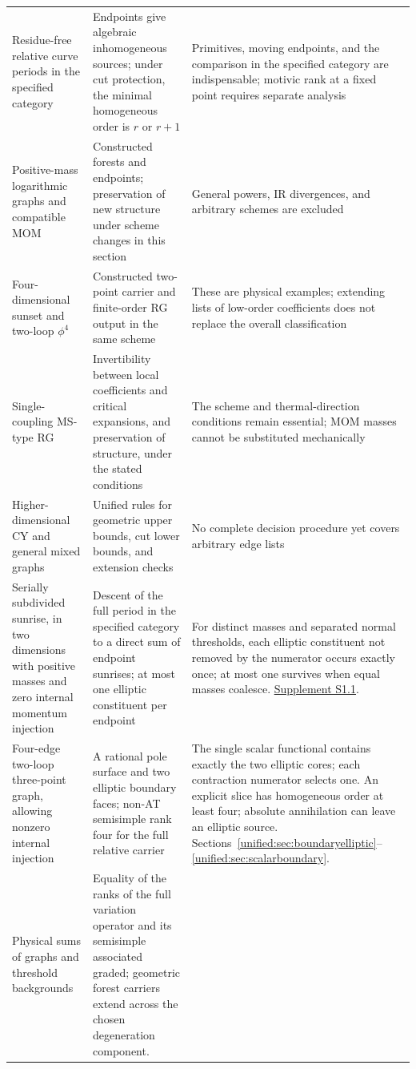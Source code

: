 \documentclass[11pt,a4paper,oneside]{article}
\theoremstyle{plain}
\theoremstyle{definition}
\theoremstyle{remark}
\numberwithin{equation}{section}
\newcommand{\otherref}[2]{\href{#1.pdf}{#2}}
\begin{document}
\begin{center}
\begin{longtable}{>{\raggedright\arraybackslash}p{29mm}>{\raggedright\arraybackslash}p{51mm}>{\raggedright\arraybackslash}p{61mm}}
Residue-free relative curve periods in the specified category&
Endpoints give algebraic inhomogeneous sources; under cut protection, the minimal homogeneous order is $r$ or $r+1$&
Primitives, moving endpoints, and the comparison in the specified category are indispensable; motivic rank at a fixed point requires separate analysis\\
Positive-mass logarithmic graphs and compatible MOM&
Constructed forests and endpoints; preservation of new structure under scheme changes in this section&
General powers, IR divergences, and arbitrary schemes are excluded\\
Four-dimensional sunset and two-loop $\phi^4$&
Constructed two-point carrier and finite-order RG output in the same scheme&
These are physical examples; extending lists of low-order coefficients does not replace the overall classification\\
Single-coupling MS-type RG&
Invertibility between local coefficients and critical expansions, and preservation of structure, under the stated conditions&
The scheme and thermal-direction conditions remain essential; MOM masses cannot be substituted mechanically\\
Higher-dimensional CY and general mixed graphs&
Unified rules for geometric upper bounds, cut lower bounds, and extension checks&
No complete decision procedure yet covers arbitrary edge lists\\
Serially subdivided sunrise, in two dimensions with positive masses and zero internal momentum injection &
Descent of the full period in the specified category to a direct sum of endpoint sunrises; at most one elliptic constituent per endpoint &
For distinct masses and separated normal thresholds, each elliptic constituent not removed by the numerator occurs exactly once; at most one survives when equal masses coalesce. \otherref{feynman_periods_supplement_en}{Supplement S1.1}.\\
Four-edge two-loop three-point graph, allowing nonzero internal injection &
A rational pole surface and two elliptic boundary faces; non-AT semisimple rank four for the full relative carrier &
The single scalar functional contains exactly the two elliptic cores; each contraction numerator selects one. An explicit slice has homogeneous order at least four; absolute annihilation can leave an elliptic source. Sections~\ref{unified:sec:boundaryelliptic}--\ref{unified:sec:scalarboundary}.\\
Physical sums of graphs and threshold backgrounds&
Equality of the ranks of the full variation operator and its semisimple associated graded; geometric forest carriers extend across the chosen degeneration component.&

\end{longtable}
\end{center}
\end{document}
